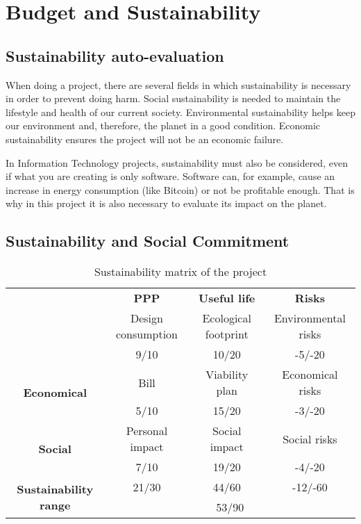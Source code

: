 


\chapter{Budget and Sustainability}


\section{Sustainability auto-evaluation}
When doing a project, there are several fields in which sustainability is necessary in order to prevent doing harm. Social sustainability is needed to maintain the lifestyle and health of our current society. Environmental sustainability helps keep our environment and, therefore, the planet in a good condition. Economic sustainability ensures the project will not be an economic failure.

In Information Technology projects, sustainability must also be considered, even if what you are creating is only software. Software can, for example, cause an increase in energy consumption (like Bitcoin) or not be profitable enough. That is why in this project it is also necessary to evaluate its impact on the planet. 

\section{Sustainability and Social Commitment}

\begin{table}[H]
\begin{center}
\begin{tabular}{|c|c|c|c|}
	\cline{2-4}
	\multicolumn{1}{c|}{} & \bf PPP & \bf Useful life & \bf Risks \\\hhline{-===}
	
	\multirow{2}{*}{\bf Environmental} & Design consumption & Ecological footprint & Environmental risks \\\cline{2-4}
	& 9/10 & 10/20 & -5/-20\\\hline
	
	\multirow{2}{*}{\bf Economical} & Bill & Viability plan & Economical risks \\\cline{2-4}
	& 5/10 & 15/20 & -3/-20\\\hline
	
	\multirow{2}{*}{\bf Social} & Personal impact & Social impact & Social risks \\\cline{2-4}
	& 7/10 & 19/20 & -4/-20\\\hline\hline
	
	\multirow{2}{*}{\bf Sustainability range} & 21/30 & 44/60 & -12/-60 \\\cline{2-4}
	& \multicolumn{3}{|c|}{53/90}\\\hline
	
\end{tabular}
\caption{Sustainability matrix of the project}
\label{tab::sustainability}
\end{center}
\end{table}

